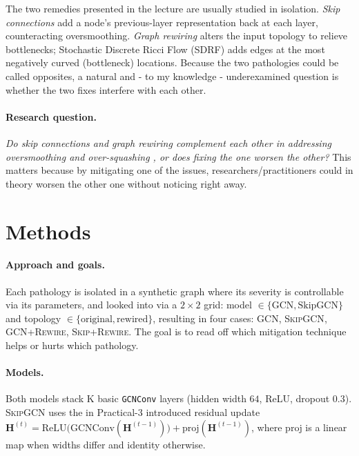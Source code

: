 \documentclass[inlineanswers]{exam2024}
\begin{document}
The two remedies presented in the lecture are usually studied in isolation. \emph{Skip connections} \cite{xu2018jk} add a node's previous-layer representation back at each layer, counteracting oversmoothing. \emph{Graph rewiring}
\cite{topping2022} alters the input topology to relieve bottlenecks; Stochastic Discrete Ricci Flow (SDRF) adds edges at the most negatively curved (bottleneck) locations. Because the two pathologies could be called opposites, a natural and - to my
knowledge - underexamined question is whether the two fixes interfere with each other.

\paragraph{Research question.}
\emph{Do skip connections and graph rewiring complement each other in addressing oversmoothing and over-squashing , or does fixing the one worsen the other?} This matters because by mitigating one of the issues, researchers/practitioners could in theory worsen the other one without noticing right away.

\section{Methods}
\label{sec:methods}

\paragraph{Approach and goals.}
Each pathology is isolated in a synthetic graph where its severity is controllable via its parameters, and looked into via a $2\times2$ grid: model
$\in\{\text{GCN},\text{SkipGCN}\}$ and topology $\in\{\text{original},\text{rewired}\}$,
resulting in four cases: \textsc{GCN}, \textsc{SkipGCN}, \textsc{GCN+Rewire}, \textsc{Skip+Rewire}.
The goal is to read off which mitigation technique helps or hurts which pathology.

\paragraph{Models.}
Both models stack K basic \texttt{GCNConv} layers (hidden width $64$, ReLU, dropout
$0.3$). \textsc{SkipGCN} uses the in Practical-3 introduced residual update
$\bm{H}^{(t)}=\mathrm{ReLU}\big(\mathrm{GCNConv}(\bm{H}^{(t-1)})\big)+
\mathrm{proj}(\bm{H}^{(t-1)})$, where $\mathrm{proj}$ is a linear map when widths differ and identity otherwise.
\end{document}
